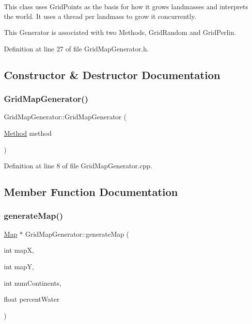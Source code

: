 This class uses Grid\+Points as the basis for how it grows landmasses and interprets the world. It uses a thread per landmass to grow it concurrently.

This Generator is associated with two Methods, Grid\+Random and Grid\+Perlin. 

Definition at line 27 of file Grid\+Map\+Generator.\+h.



\subsection{Constructor \& Destructor Documentation}
\mbox{\label{class_world_architect_1_1_grid_map_generator_a1e1a93116b9dac21c9e1c02ab46c3431}} 
\subsubsection{\texorpdfstring{GridMapGenerator()}{GridMapGenerator()}}
{\footnotesize\ttfamily Grid\+Map\+Generator\+::\+Grid\+Map\+Generator (\begin{DoxyParamCaption}\item[{\mbox{\hyperlink{namespace_world_architect_a9bb4333e2d555bf42bf7d14ec2a2ae7b}{Method}}}]{method }\end{DoxyParamCaption})}



Definition at line 8 of file Grid\+Map\+Generator.\+cpp.



\subsection{Member Function Documentation}
\mbox{\label{class_world_architect_1_1_grid_map_generator_a7155387434e6d740c487eeade985f78d}} 
\subsubsection{\texorpdfstring{generateMap()}{generateMap()}}
{\footnotesize\ttfamily \mbox{\hyperlink{class_world_architect_1_1_map}{Map}} $\ast$ Grid\+Map\+Generator\+::generate\+Map (\begin{DoxyParamCaption}\item[{int}]{mapX,  }\item[{int}]{mapY,  }\item[{int}]{num\+Continents,  }\item[{float}]{percent\+Water }\end{DoxyParamCaption})\hspace{0.3cm}{\ttfamily [virtual]}}

